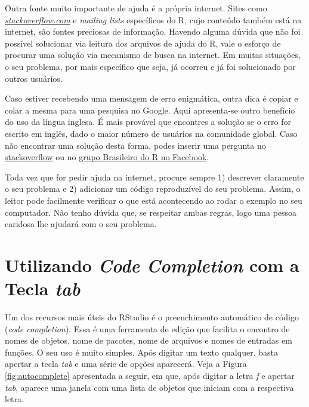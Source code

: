 \documentclass[
  11pt,
]{book}
\newenvironment{rmdcaution}
{\begin{cautionblock}

} {\end{cautionblock}}
\begin{document}
Outra fonte muito importante de ajuda é a própria internet. Sites como \href{http://stackoverflow.com/}{\emph{stackoverflow.com}} e \emph{mailing lists} específicos do R, cujo conteúdo também está na internet, são fontes preciosas de informação. Havendo alguma dúvida que não foi possível solucionar via leitura dos arquivos de ajuda do R, vale o esforço de procurar uma solução via mecanismo de busca na internet. Em muitas situações, o seu problema, por mais específico que seja, já ocorreu e já foi solucionado por outros usuários.

Caso estiver recebendo uma mensagem de erro enigmática, outra dica é copiar e colar a mesma para uma pesquisa no Google. Aqui apresenta-se outro benefício do uso da língua inglesa. É mais provável que encontres a solução se o erro for escrito em inglês, dado o maior número de usuários na comunidade global. Caso não encontrar uma solução desta forma, podes inserir uma pergunta no \href{http://stackoverflow.com/}{stackoverflow} ou no \href{https://www.facebook.com/groups/1410023525939155/}{grupo Brasileiro do R no Facebook}.

\begin{rmdcaution}
Toda vez que for pedir ajuda na internet, procure sempre 1) descrever
claramente o seu problema e 2) adicionar um código reproduzível do seu
problema. Assim, o leitor pode facilmente verificar o que está
acontecendo ao rodar o exemplo no seu computador. Não tenho dúvida que,
se respeitar ambas regras, logo uma pessoa caridosa lhe ajudará com o
seu problema.
\end{rmdcaution}

\hypertarget{utilizando-code-completion-com-a-tecla-tab}{%
\section{\texorpdfstring{Utilizando \emph{Code Completion} com a Tecla \emph{tab}}{Utilizando Code Completion com a Tecla tab}}\label{utilizando-code-completion-com-a-tecla-tab}}

Um dos recursos mais úteis do RStudio é o preenchimento automático de código (\emph{code completion}). Essa é uma ferramenta de edição que facilita o encontro de nomes de objetos, nome de pacotes, nome de arquivos e nomes de entradas em funções. O seu uso é muito simples. Após digitar um texto qualquer, basta apertar a tecla \emph{tab} e uma série de opções aparecerá. Veja a Figura \ref{fig:autocomplete} apresentada a seguir, em que, após digitar a letra \emph{f} e apertar \emph{tab}, aparece uma janela com uma lista de objetos que iniciam com a respectiva letra.
\end{document}
